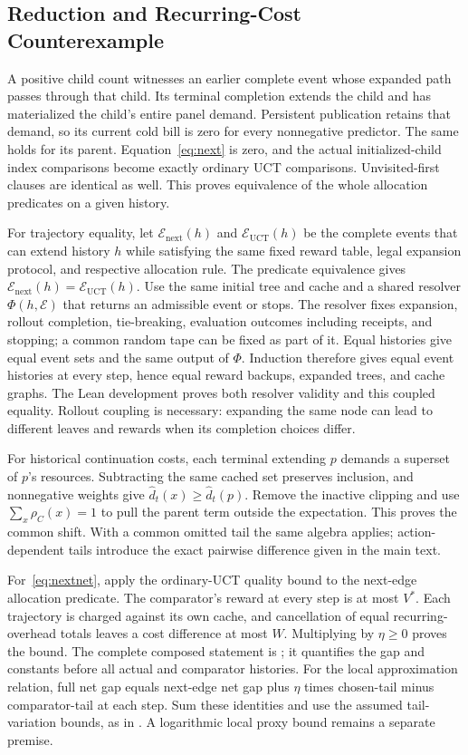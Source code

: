 \subsection{Reduction and Recurring-Cost Counterexample}
A positive child count witnesses an earlier complete event whose expanded path passes through that child. Its terminal completion extends the child and has materialized the child's entire panel demand. Persistent publication retains that demand, so its current cold bill is zero for every nonnegative predictor. The same holds for its parent. Equation~\eqref{eq:next} is zero, and the actual initialized-child index comparisons become exactly ordinary UCT comparisons. Unvisited-first clauses are identical as well. This proves equivalence of the whole allocation predicates on a given history.

For trajectory equality, let $\mathcal E_{\mathrm{next}}(h)$ and $\mathcal E_{\mathrm{UCT}}(h)$ be the complete events that can extend history $h$ while satisfying the same fixed reward table, legal expansion protocol, and respective allocation rule. The predicate equivalence gives $\mathcal E_{\mathrm{next}}(h)=\mathcal E_{\mathrm{UCT}}(h)$. Use the same initial tree and cache and a shared resolver $\Phi(h,\mathcal E)$ that returns an admissible event or stops. The resolver fixes expansion, rollout completion, tie-breaking, evaluation outcomes including receipts, and stopping; a common random tape can be fixed as part of it. Equal histories give equal event sets and the same output of $\Phi$. Induction therefore gives equal event histories at every step, hence equal reward backups, expanded trees, and cache graphs. The Lean development proves both resolver validity and this coupled equality. Rollout coupling is necessary: expanding the same node can lead to different leaves and rewards when its completion choices differ.

For historical continuation costs, each terminal extending $p$ demands a superset of $p$'s resources. Subtracting the same cached set preserves inclusion, and nonnegative weights give $\widehat d_t(x)\ge\widehat d_t(p)$. Remove the inactive clipping and use $\sum_x\rho_C(x)=1$ to pull the parent term outside the expectation. This proves the common shift. With a common omitted tail the same algebra applies; action-dependent tails introduce the exact pairwise difference given in the main text.

For~\eqref{eq:nextnet}, apply the ordinary-UCT quality bound to the next-edge allocation predicate. The comparator's reward at every step is at most $V^*$. Each trajectory is charged against its own cache, and cancellation of equal recurring-overhead totals leaves a cost difference at most $W$. Multiplying by $\eta\ge0$ proves the bound. The complete composed statement is ; it quantifies the gap and constants before all actual and comparator histories. For the local approximation relation, full net gap equals next-edge net gap plus $\eta$ times chosen-tail minus comparator-tail at each step. Sum these identities and use the assumed tail-variation bounds, as in . A logarithmic local proxy bound remains a separate premise.

